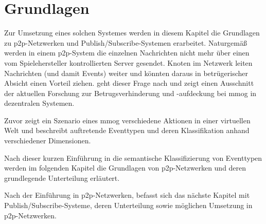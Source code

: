\chapter{Grundlagen}
\label{chap:grundlagen}

Zur Umsetzung eines solchen Systemes werden in diesem Kapitel die Grundlagen zu \ac{p2p}-Netzwerken und Publish/Subscribe-Systemen erarbeitet. Naturgemäß werden in einem \ac{p2p}-System die einzelnen Nachrichten nicht mehr über einen vom Spielehersteller kontrollierten Server gesendet. Knoten im Netzwerk leiten Nachrichten (und damit Events) weiter und könnten daraus in betrügerischer Absicht einen Vorteil ziehen.  geht dieser Frage nach und zeigt einen Ausschnitt der aktuellen Forschung zur Betrugsverhinderung und -aufdeckung bei \ac{mmog} in dezentralen Systemen.

Zuvor zeigt ein Szenario eines \ac{mmog} verschiedene Aktionen in einer virtuellen Welt und beschreibt auftretende Eventtypen und deren Klassifikation anhand verschiedener Dimensionen.



Nach dieser kurzen Einführung in die semantische Klassifizierung von Eventtypen werden im folgenden Kapitel die Grundlagen von \ac{p2p}-Netzwerken und deren grundlegende Unterteilung erläutert.







Nach der Einführung in \ac{p2p}-Netzwerken, befasst sich das nächste Kapitel mit Publish/Subscribe-Systeme, deren Unterteilung sowie möglichen Umsetzung in \ac{p2p}-Netzwerken. 


